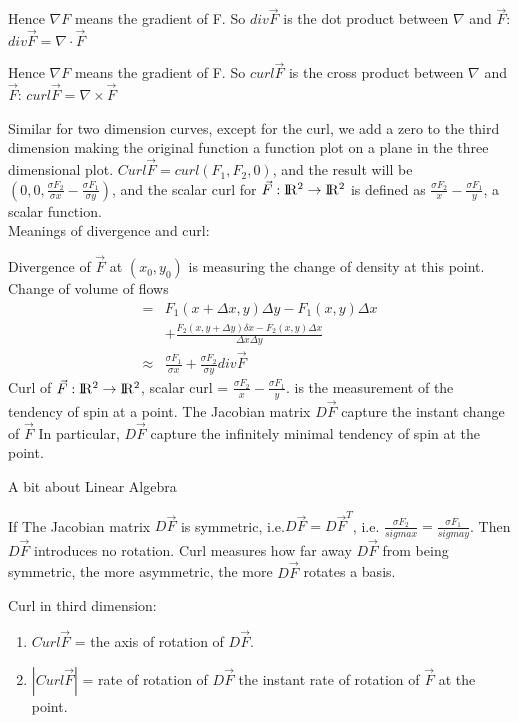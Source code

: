 \documentclass{article}
\newcommand{\R}{\rm I\!R}
\begin{document}
        Hence $\nabla F$ means the gradient of F. So $div\vec{F}$ is the dot product between $\nabla$ and $\vec{F}$: $div\vec{F} = \nabla \cdot \vec{F}$
        
        Hence $\nabla F$ means the gradient of F. So $curl\vec{F}$ is the cross product between $\nabla$ and $\vec{F}$: $curl\vec{F}=\nabla \times \vec{F}$
    
        Similar for two dimension curves, except for the curl, we add a zero to the third dimension making the original function a function plot on a plane in the three dimensional plot. $Curl\vec{F} = curl(F_1,F_2,0)$, and the result will be $(0,0,\frac{\sigma F_2}{\sigma x}-\frac{\sigma F_1}{\sigma y})$, and the scalar curl for $\vec{F}:\R^2\rightarrow\R^2$ is defined as $\frac{\sigma F_2}{x}-\frac{\sigma F_1}{y}$, a scalar function.\\
        
        Meanings of divergence and curl:
        
        Divergence of $\vec{F}$ at $(x_0,y_0)$ is measuring the change of density at this point. Change of volume of flows 
        \begin{align}
            =& F_1(x+\Delta x,y)\Delta y - F_1(x, y)\Delta x\\
            &+\frac{F_2(x,y+\Delta y)\delta x-F_2(x,y)\Delta x}{\Delta x\Delta y}\\
            \approx &\frac{\sigma F_1}{\sigma x}+\frac{\sigma F_2}{\sigma y}div\vec{F}
        \end{align}
        Curl of $\vec{F}:\R^2\rightarrow\R^2$, scalar curl = $\frac{\sigma F_2}{x}-\frac{\sigma F_1}{y}$. is the measurement of the tendency of spin at a point. The Jacobian matrix $D\vec{F}$ capture the instant change of $\vec{F}$ In particular, $D\vec{F}$ capture the infinitely minimal tendency of spin at the point.
        
        A bit about Linear Algebra
        
        If The Jacobian matrix $D\vec{F}$ is symmetric, i.e.$D\vec{F} = D\vec{F}^T$, i.e. $\frac{\sigma F_2}{sigma x} = \frac{\sigma F_1}{sigma y}$. Then $D\vec{F}$ introduces no rotation. Curl measures how far away $D\vec{F}$ from being symmetric, the more asymmetric, the more $D\vec{F}$ rotates a basis. 
        
        Curl in third dimension:
        \begin{enumerate}
            \item $Curl\vec{F}$ = the axis of rotation of $D\vec{F}$. 
            \item $|Curl\vec{F}|$  = rate of rotation of $D\vec{F}$ the instant rate of rotation of $\vec{F}$ at the point.
        \end{enumerate}
        
\end{document}
